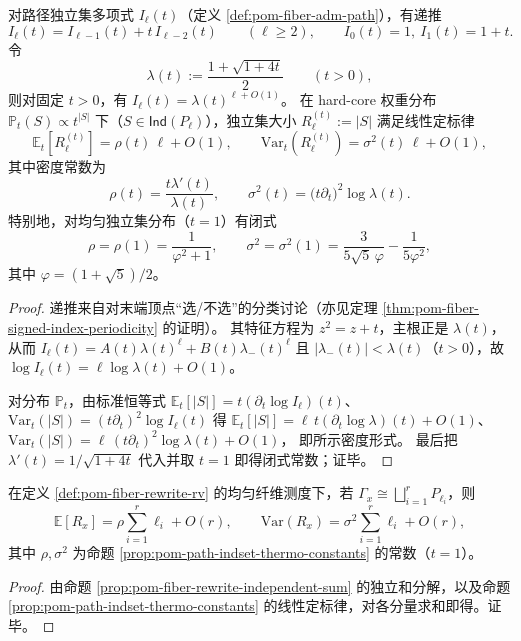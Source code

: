 \begin{proposition}\label{prop:pom-path-indset-thermo-constants}
对路径独立集多项式 \(I_{\ell}(t)\)（定义 \ref{def:pom-fiber-adm-path}），有递推
\[
I_{\ell}(t)=I_{\ell-1}(t)+t\,I_{\ell-2}(t)\qquad(\ell\ge 2),
\qquad
I_0(t)=1,\ I_1(t)=1+t.
\]
令
\[
\lambda(t):=\frac{1+\sqrt{1+4t}}{2}\qquad(t>0),
\]
则对固定 \(t>0\)，有 \(I_{\ell}(t)=\lambda(t)^{\ell+O(1)}\)。
在 hard-core 权重分布
\(
\mathbb P_t(S)\propto t^{|S|}
\)
下（\(S\in\mathsf{Ind}(P_{\ell})\)），独立集大小 \(R_{\ell}^{(t)}:=|S|\) 满足线性定标律
\[
\mathbb{E}_t[R_{\ell}^{(t)}]=\rho(t)\,\ell+O(1),\qquad
\mathrm{Var}_t(R_{\ell}^{(t)})=\sigma^2(t)\,\ell+O(1),
\]
其中密度常数为
\[
\rho(t)=\frac{t\lambda'(t)}{\lambda(t)},\qquad
\sigma^2(t)=\bigl(t\partial_t\bigr)^2\log\lambda(t).
\]
特别地，对均匀独立集分布（\(t=1\)）有闭式
\[
\rho=\rho(1)=\frac{1}{\varphi^2+1},
\qquad
\sigma^2=\sigma^2(1)=\frac{3}{5\sqrt5\,\varphi}-\frac{1}{5\varphi^2},
\]
其中 \(\varphi=(1+\sqrt5)/2\)。
\end{proposition}
\begin{proof}
递推来自对末端顶点“选/不选”的分类讨论（亦见定理 \ref{thm:pom-fiber-signed-index-periodicity} 的证明）。
其特征方程为 \(z^2=z+t\)，主根正是 \(\lambda(t)\)，从而
\(
I_{\ell}(t)=A(t)\lambda(t)^{\ell}+B(t)\lambda_-(t)^{\ell}
\)
且 \(|\lambda_-(t)|<\lambda(t)\)（\(t>0\)），故 \(\log I_{\ell}(t)=\ell\log\lambda(t)+O(1)\)。
\par
对分布 \(\mathbb P_t\)，由标准恒等式
\(
\mathbb E_t[|S|]=t(\partial_t\log I_{\ell})(t)
\)、
\(
\mathrm{Var}_t(|S|)=(t\partial_t)^2\log I_{\ell}(t)
\)
得
\(
\mathbb E_t[|S|]=\ell\,t(\partial_t\log\lambda)(t)+O(1)
\)、
\(
\mathrm{Var}_t(|S|)=\ell\,(t\partial_t)^2\log\lambda(t)+O(1)
\)，
即所示密度形式。
最后把 \(\lambda'(t)=1/\sqrt{1+4t}\) 代入并取 \(t=1\) 即得闭式常数；证毕。
\end{proof}

\begin{corollary}\label{cor:pom-fiber-rewrite-mean-var-density}
在定义 \ref{def:pom-fiber-rewrite-rv} 的均匀纤维测度下，若 \(\Gamma_x\cong\bigsqcup_{i=1}^r P_{\ell_i}\)，则
\[
\mathbb E[R_x]=\rho\sum_{i=1}^r \ell_i+O(r),
\qquad
\mathrm{Var}(R_x)=\sigma^2\sum_{i=1}^r \ell_i+O(r),
\]
其中 \(\rho,\sigma^2\) 为命题 \ref{prop:pom-path-indset-thermo-constants} 的常数（\(t=1\)）。
\end{corollary}
\begin{proof}
由命题 \ref{prop:pom-fiber-rewrite-independent-sum} 的独立和分解，以及命题 \ref{prop:pom-path-indset-thermo-constants} 的线性定标律，对各分量求和即得。证毕。
\end{proof}

